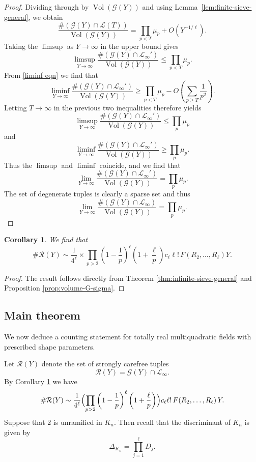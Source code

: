 \documentclass{amsart}
\newcommand{\op}[1]{\operatorname{#1}}
\theoremstyle{plain}
\newtheorem{corollary}[theorem]{Corollary}
\theoremstyle{definition}
\theoremstyle{remark}
\numberwithin{equation}{section}
\begin{document}
\begin{proof}
Dividing through by $\op{Vol}(\mathcal G(Y))$ and using
Lemma~\ref{lem:finite-sieve-general}, we obtain
\[
\frac{\#(\mathcal G(Y)\cap\mathcal L(T))}
{\op{Vol}(\mathcal G(Y))}
=
\prod_{p<T}\mu_p
+
O\!\left(Y^{-1/\ell}\right).
\]
Taking the $\limsup$ as $Y\to\infty$ in the upper bound gives
\[
\limsup_{Y\to\infty}
\frac{\#(\mathcal G(Y)\cap\mathcal L_\infty')}
{\op{Vol}(\mathcal G(Y))}
\le
\prod_{p<T}\mu_p .
\]
From \eqref{liminf eqn} we find that
\[
\liminf_{Y\to\infty}
\frac{\#(\mathcal G(Y)\cap\mathcal L_\infty')}
{\op{Vol}(\mathcal G(Y))}
\ge
\prod_{p<T}\mu_p
-
O\!\left(\sum_{p\geq T} \frac{1}{p^2}\right).
\]
Letting $T\to\infty$ in the previous two inequalities therefore yields
\[
\limsup_{Y\to\infty}
\frac{\#(\mathcal G(Y)\cap\mathcal L_\infty')}
{\op{Vol}(\mathcal G(Y))}
\le
\prod_p\mu_p
\]
and
\[
\liminf_{Y\to\infty}
\frac{\#(\mathcal G(Y)\cap\mathcal L_\infty')}
{\op{Vol}(\mathcal G(Y))}
\ge
\prod_p\mu_p .
\]
\noindent Thus the $\limsup$ and $\liminf$ coincide, and we find that
\[
\lim_{Y\to\infty}
\frac{\#(\mathcal G(Y)\cap\mathcal L_\infty')}
{\op{Vol}(\mathcal G(Y))}
=
\prod_p\mu_p.
\]
The set of degenerate tuples is clearly a sparse set and thus 
\[
\lim_{Y\to\infty}
\frac{\#(\mathcal G(Y)\cap\mathcal L_\infty)}
{\op{Vol}(\mathcal G(Y))}
=
\prod_p\mu_p.
\]
\end{proof}

\begin{corollary}\label{last cor}
    We find that 
    \[\#\mathcal{R}(Y)\sim \frac{1}{4^\ell}\times \prod_{p>2} \left(1-\frac{1}{p}\right)^\ell\left(1+\frac{\ell}{p}\right) c_\ell\ell!\,F(R_2,\dots,R_\ell) Y.\]
\end{corollary}
\begin{proof}
    The result follows directly from Theorem \ref{thm:infinite-sieve-general} and Proposition \ref{prop:volume-G-sigma}.
\end{proof}
\subsection{Main theorem}

We now deduce a counting statement for totally real multiquadratic fields
with prescribed shape parameters.

Let $\mathcal{R}(Y)$ denote the set of strongly carefree tuples
\[
\mathcal{R}(Y)=\mathcal{G}(Y)\cap\mathcal{L}_\infty .
\]
By Corollary \ref{last cor} we have
\[
\#\mathcal{R}(Y)\sim
\frac{1}{4^\ell}
\Bigl(\prod_{p>2}\left(1-\frac1p\right)^\ell
\left(1+\frac{\ell}{p}\right)\Bigr)
c_\ell\ell !\,F(R_2,\dots,R_\ell)\,Y .
\]
Suppose that $2$ is unramified in $K_n$. Then recall that the discriminant of $K_n$ is given by
\[
\Delta_{K_n}=\prod_{j=1}^{\ell}D_j.
\]
\end{document}
